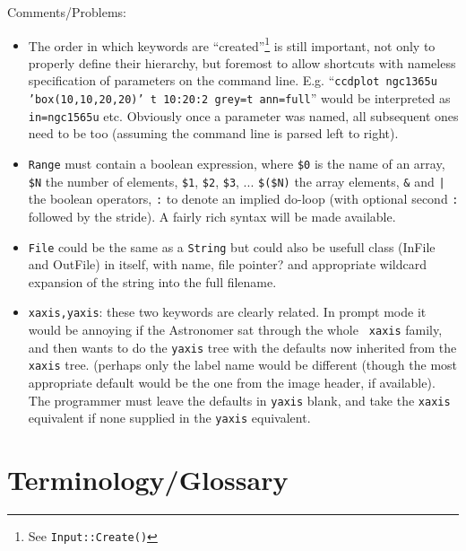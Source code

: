 Comments/Problems:

\begin{itemize}

\item
The order in which keywords are ``created''\footnote{See 
{\tt Input::Create()}} is still important, not only
to properly define their hierarchy, but foremost to allow shortcuts with
nameless specification of parameters on the command line. E.g.
``{\tt ccdplot ngc1365u 'box(10,10,20,20)' t 10:20:2 grey=t ann=full}''
would be interpreted as {\tt in=ngc1565u} etc. Obviously
once a parameter was named, all subsequent ones need to be too
(assuming the command line is parsed left to right).	

\item 

{\tt Range} must contain a boolean expression, where \verb+$0+ is the
name of an array, \verb+$N+ the number of elements, \verb+$1+,
\verb+$2+, \verb+$3+, ...  \verb+$($N)+ the array elements, \verb+&+ and
\verb+|+ the boolean operators, \verb+:+ to denote an implied do-loop
(with optional second \verb+:+ followed by the stride). A fairly
rich syntax will be made available.


\item 

{\tt File} could be the same as a {\tt String} but 
could also be usefull class (InFile and OutFile) in itself,
with name, file pointer? and appropriate wildcard expansion of
the string into the full filename.

\item 

{\tt xaxis,yaxis}: these two keywords are clearly related.  In prompt
mode it would be annoying if the Astronomer sat through the whole {\tt
xaxis} family, and then wants to do the {\tt yaxis} tree with the
defaults now inherited from the {\tt xaxis} tree.  (perhaps only the
label name would be different (though the most appropriate default would
be the one from the image header, if available).  The programmer must
leave the defaults in {\tt yaxis} blank, and take the {\tt xaxis}
equivalent if none supplied in the {\tt yaxis} equivalent. 


\end{itemize}


\section{Terminology/Glossary}

